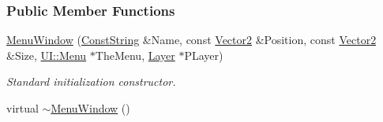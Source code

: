 \subsubsection*{Public Member Functions}
\begin{DoxyCompactItemize}
\item 
\hyperlink{classphys_1_1UI_1_1MenuWindow_a85f79c6bde9f8ccfbb52f853f58a0f3f}{MenuWindow} (\hyperlink{namespacephys_a5ce5049f8b4bf88d6413c47b504ebb31}{ConstString} \&Name, const \hyperlink{classphys_1_1Vector2}{Vector2} \&Position, const \hyperlink{classphys_1_1Vector2}{Vector2} \&Size, \hyperlink{classphys_1_1UI_1_1Menu}{UI::Menu} $\ast$TheMenu, \hyperlink{classphys_1_1UI_1_1Layer}{Layer} $\ast$PLayer)
\begin{DoxyCompactList}\small\item\em Standard initialization constructor. \item\end{DoxyCompactList}\item 
\hypertarget{classphys_1_1UI_1_1MenuWindow_a8de1eab7a7897e24dfb722cce7d903eb}{
virtual \hyperlink{classphys_1_1UI_1_1MenuWindow_a8de1eab7a7897e24dfb722cce7d903eb}{$\sim$MenuWindow} ()}
\label{d4/d07/classphys_1_1UI_1_1MenuWindow_a8de1eab7a7897e24dfb722cce7d903eb}


\end{DoxyCompactItemize}
